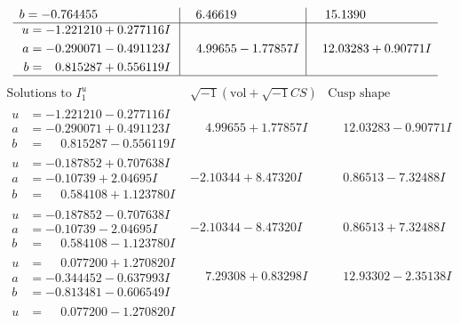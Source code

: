 \documentclass[1p]{elsarticle_modified}
\theoremstyle{definition}
\newcommand{\I}{\sqrt{-1}}
\begin{document}
$$\begin{array}{c|c|c}
\begin{aligned}
b &= -0.764455\phantom{ +0.000000I}\end{aligned}
 & \phantom{-}6.46619\phantom{ +0.000000I} & \phantom{-}15.1390\phantom{ +0.000000I} \\ \hline\begin{aligned}
u &= -1.221210 + 0.277116 I \\
a &= -0.290071 - 0.491123 I \\
b &= \phantom{-}0.815287 + 0.556119 I\end{aligned}
 & \phantom{-}4.99655 - 1.77857 I & \phantom{-}12.03283 + 0.90771 I\\
 \hline 
 \end{array}$$\newpage$$\begin{array}{c|c|c}  
\text{Solutions to }I^u_{1}& \I (\text{vol} + \sqrt{-1}CS) & \text{Cusp shape}\\
 \hline 
\begin{aligned}
u &= -1.221210 - 0.277116 I \\
a &= -0.290071 + 0.491123 I \\
b &= \phantom{-}0.815287 - 0.556119 I\end{aligned}
 & \phantom{-}4.99655 + 1.77857 I & \phantom{-}12.03283 - 0.90771 I \\ \hline\begin{aligned}
u &= -0.187852 + 0.707638 I \\
a &= -0.10739 + 2.04695 I \\
b &= \phantom{-}0.584108 + 1.123780 I\end{aligned}
 & -2.10344 + 8.47320 I & \phantom{-}0.86513 - 7.32488 I \\ \hline\begin{aligned}
u &= -0.187852 - 0.707638 I \\
a &= -0.10739 - 2.04695 I \\
b &= \phantom{-}0.584108 - 1.123780 I\end{aligned}
 & -2.10344 - 8.47320 I & \phantom{-}0.86513 + 7.32488 I \\ \hline\begin{aligned}
u &= \phantom{-}0.077200 + 1.270820 I \\
a &= -0.344452 - 0.637993 I \\
b &= -0.813481 - 0.606549 I\end{aligned}
 & \phantom{-}7.29308 + 0.83298 I & \phantom{-}12.93302 - 2.35138 I \\ \hline\begin{aligned}
u &= \phantom{-}0.077200 - 1.270820 I \\

\end{aligned}
\end{array}$$
\end{document}
